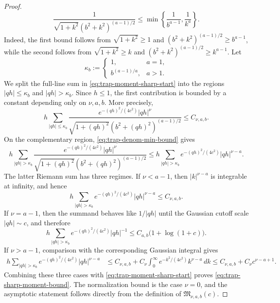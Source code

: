\documentclass[10pt,a4paper]{amsart}
\begin{document}
\begin{proof}
\begin{equation}
\frac{1}{\sqrt{1+k^2}(b^2+k^2)^{(a-1)/2}}\le \min\left\{\frac{1}{b^{a-1}},\frac{1}{k^a}\right\}.
\end{equation}
Indeed, the first bound follows from \(\sqrt{1+k^2}\ge1\) and \((b^2+k^2)^{(a-1)/2}\ge b^{a-1}\), while the second follows from \(\sqrt{1+k^2}\ge k\) and \((b^2+k^2)^{(a-1)/2}\ge k^{a-1}\). Let
\begin{equation}\label{eq:trap-kappa-b-def}
\kappa_b := \begin{cases} 1, & a=1,\\ b^{(a-1)/a}, & a>1. \end{cases}
\end{equation}
We split the full-line sum in \cref{eq:trap-moment-sharp-start} into the regions \(|qh|\le \kappa_b\) and \(|qh|>\kappa_b\). Since \(h\le1\), the first contribution is bounded by a constant depending only on \(\nu,a,b\). More precisely,
\begin{equation}
h\sum_{|qh|\le\kappa_b}\frac{e^{-(qh)^2/(4c^2)}|qh|^\nu}{\sqrt{1+(qh)^2}(b^2+(qh)^2)^{(a-1)/2}}\le C_{\nu,a,b}.
\end{equation}
On the complementary region, \cref{eq:trap-denom-min-bound} gives
\begin{equation}
h\sum_{|qh|>\kappa_b}\frac{e^{-(qh)^2/(4c^2)}|qh|^\nu}{\sqrt{1+(qh)^2}(b^2+(qh)^2)^{(a-1)/2}}\le h\sum_{|qh|>\kappa_b}e^{-(qh)^2/(4c^2)}|qh|^{\nu-a}.
\end{equation}
The latter Riemann sum has three regimes. If \(\nu<a-1\), then \(|k|^{\nu-a}\) is integrable at infinity, and hence
\begin{equation}
h\sum_{|qh|>\kappa_b}e^{-(qh)^2/(4c^2)}|qh|^{\nu-a}\le C_{\nu,a,b}.
\end{equation}
If \(\nu=a-1\), then the summand behaves like \(1/|qh|\) until the Gaussian cutoff scale \(|qh|\sim c\), and therefore
\begin{equation}
h\sum_{|qh|>\kappa_b}e^{-(qh)^2/(4c^2)}|qh|^{-1}\le C_{a,b}\bigl(1+\log(1+c)\bigr).
\end{equation}
If \(\nu>a-1\), comparison with the corresponding Gaussian integral gives
\begin{align}
h\sum_{|qh|>\kappa_b}e^{-(qh)^2/(4c^2)}|qh|^{\nu-a} &\le C_{\nu,a,b}+C_\nu\int_0^\infty e^{-k^2/(4c^2)}k^{\nu-a}\,dk \le C_{\nu,a,b}+C_\nu c^{\nu-a+1}.
\end{align}
Combining these three cases with \cref{eq:trap-moment-sharp-start} proves \cref{eq:trap-sharp-moment-bound}. The normalization bound is the case \(\nu=0\), and the asymptotic statement follows directly from the definition of \(\mathfrak M_{\nu,a,b}(c)\).
\end{proof}
\end{document}
